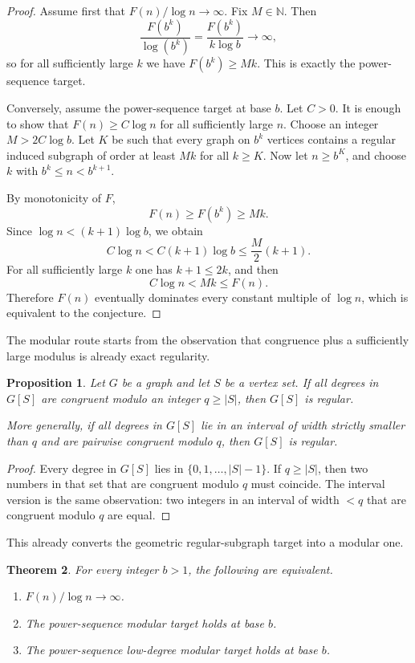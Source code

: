 \documentclass[11pt]{amsart}
\newtheorem{theorem}{Theorem}[section]
\newtheorem{proposition}[theorem]{Proposition}
\theoremstyle{definition}
\newcommand{\N}{\mathbb{N}}
\begin{document}
\begin{proof}
Assume first that $F(n)/\log n \to \infty$. Fix $M \in \N$. Then
\[
  \frac{F(b^k)}{\log(b^k)} = \frac{F(b^k)}{k \log b} \longrightarrow \infty ,
\]
so for all sufficiently large $k$ we have $F(b^k) \ge Mk$. This is exactly the power-sequence
target.

Conversely, assume the power-sequence target at base $b$. Let $C>0$. It is enough to show that
$F(n) \ge C \log n$ for all sufficiently large $n$. Choose an integer $M > 2C \log b$. Let $K$ be
such that every graph on $b^k$ vertices contains a regular induced subgraph of order at least $Mk$
for all $k \ge K$. Now let $n \ge b^K$, and choose $k$ with $b^k \le n < b^{k+1}$.

By monotonicity of $F$,
\[
  F(n) \ge F(b^k) \ge Mk.
\]
Since $\log n < (k+1)\log b$, we obtain
\[
  C \log n < C(k+1)\log b \le \frac{M}{2}(k+1).
\]
For all sufficiently large $k$ one has $k+1 \le 2k$, and then
\[
  C \log n < Mk \le F(n).
\]
Therefore $F(n)$ eventually dominates every constant multiple of $\log n$, which is equivalent to
the conjecture.
\end{proof}

The modular route starts from the observation that congruence plus a sufficiently large modulus is
already exact regularity.

\begin{proposition}\label{prop:modular-collapse}
Let $G$ be a graph and let $S$ be a vertex set. If all degrees in $G[S]$ are congruent modulo an
integer $q \ge |S|$, then $G[S]$ is regular.

More generally, if all degrees in $G[S]$ lie in an interval of width strictly smaller than $q$ and
are pairwise congruent modulo $q$, then $G[S]$ is regular.
\end{proposition}

\begin{proof}
Every degree in $G[S]$ lies in $\{0,1,\dots,|S|-1\}$. If $q \ge |S|$, then two numbers in that set
that are congruent modulo $q$ must coincide. The interval version is the same observation: two
integers in an interval of width $<q$ that are congruent modulo $q$ are equal.
\end{proof}

This already converts the geometric regular-subgraph target into a modular one.

\begin{theorem}\label{thm:modular-reduction}
For every integer $b>1$, the following are equivalent.
\begin{enumerate}
  \item $F(n)/\log n \to \infty$.
  \item The power-sequence modular target holds at base $b$.
  \item The power-sequence low-degree modular target holds at base $b$.
\end{enumerate}
\end{theorem}
\end{document}
